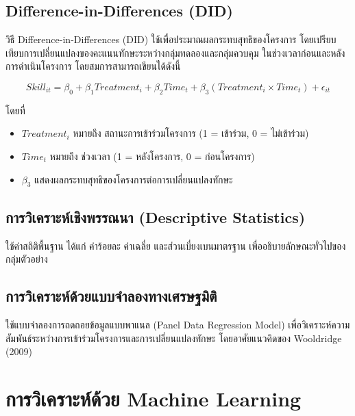 
\subsection{Difference-in-Differences (DID)}

วิธี Difference-in-Differences (DID) ใช้เพื่อประมาณผลกระทบสุทธิของโครงการ 
โดยเปรียบเทียบการเปลี่ยนแปลงของคะแนนทักษะระหว่างกลุ่มทดลองและกลุ่มควบคุม 
ในช่วงเวลาก่อนและหลังการดำเนินโครงการ โดยสมการสามารถเขียนได้ดังนี้

{\fontsize{12}{15}\selectfont

\begin{equation}
Skill_{it} = \beta_0 + \beta_1 Treatment_i + \beta_2 Time_t 
+ \beta_3 (Treatment_i \times Time_t) + \epsilon_{it}
\end{equation}

โดยที่

\begin{itemize}
\item $Treatment_i$ หมายถึง สถานะการเข้าร่วมโครงการ (1 = เข้าร่วม, 0 = ไม่เข้าร่วม)
\item $Time_t$ หมายถึง ช่วงเวลา (1 = หลังโครงการ, 0 = ก่อนโครงการ)
\item $\beta_3$ แสดงผลกระทบสุทธิของโครงการต่อการเปลี่ยนแปลงทักษะ
\end{itemize}

}

\subsection{การวิเคราะห์เชิงพรรณนา (Descriptive Statistics)}

ใช้ค่าสถิติพื้นฐาน ได้แก่ ค่าร้อยละ ค่าเฉลี่ย และส่วนเบี่ยงเบนมาตรฐาน 
เพื่ออธิบายลักษณะทั่วไปของกลุ่มตัวอย่าง


\subsection{การวิเคราะห์ด้วยแบบจำลองทางเศรษฐมิติ}

ใช้แบบจำลองการถดถอยข้อมูลแบบพาแนล (Panel Data Regression Model) 
เพื่อวิเคราะห์ความสัมพันธ์ระหว่างการเข้าร่วมโครงการและการเปลี่ยนแปลงทักษะ 
โดยอาศัยแนวคิดของ Wooldridge (2009)


\section{การวิเคราะห์ด้วย Machine Learning}


